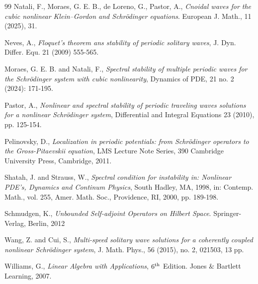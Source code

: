 \documentclass[10pt,reqno,a4paper]{amsart} %
\theoremstyle{definition} %
\numberwithin{equation}{section}
\numberwithin{figure}{section}
\begin{document}
\begin{thebibliography}{99}
 Natali, F., Moraes, G. E. B., de Loreno, G., Pastor, A., \textit{Cnoidal waves for the cubic nonlinear Klein–Gordon and Schrödinger equations}. European J. Math., 11 (2025), 31.

 Neves, A., \textit{Floquet's theorem ans stability of periodic solitary waves}, J. Dyn. Differ. Equ. 21 (2009) 555-565.

 Moraes, G. E. B. and Natali, F., \textit{Spectral stability of multiple periodic waves for the Schrödinger system with cubic nonlinearity}, Dynamics of PDE, 21 no. 2 (2024): 171-195.



 Pastor, A., \textit{Nonlinear and spectral stability of periodic traveling waves solutions for a nonlinear Schrödinger system}, Differential and Integral Equations 23 (2010), pp. 125-154.

 Pelinovsky, D., \textit{Localization in periodic potentials: from Schrödinger operators to the Gross-Pitaevskii equation}, LMS Lecture Note Series, 390 Cambridge University Press, Cambridge, 2011.

 Shatah, J. and Strauss, W., \textit{Spectral condition for instability in: Nonlinear PDE's, Dynamics and Continum Physics}, South Hadley, MA, 1998, in: Contemp. Math., vol. 255, Amer. Math. Soc., Providence, RI, 2000, pp. 189-198.

      Schmudgen, K., \textit{Unbounded Self-adjoint Operators on Hilbert Space}. Springer-Verlag,  Berlin, 2012

 Wang, Z. and  Cui, S., \textit{Multi-speed solitary wave solutions for a coherently coupled nonlinear Schrödinger system}, J. Math. Phys., 56 (2015), no. 2, 021503, 13 pp.

 Williams, G., \textit{Linear Algebra with Applications}, $6^{\rm th}$  Edition. Jones $\&$ Bartlett Learning, 2007.

\end{thebibliography}
\end{document}
